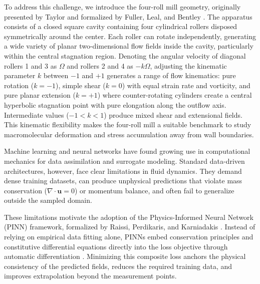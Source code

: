To address this challenge, we introduce the four-roll mill geometry, originally
presented by Taylor \cite{taylor1934formation} and formalized by
Fuller, Leal, and Bentley \cite{fuller1980flow, fuller1981flow, bentley1986experimental}.
The apparatus consists of a closed square cavity containing four cylindrical rollers
disposed symmetrically around the center. Each roller can rotate independently,
generating a wide variety of planar two-dimensional flow fields inside the cavity,
particularly within the central stagnation region. Denoting the angular velocity
of diagonal rollers 1 and 3 as $\Omega$ and rollers 2 and 4 as $-k\Omega$,
adjusting the kinematic parameter $k$ between $-1$ and $+1$ generates a range of
flow kinematics: pure rotation ($k = -1$), simple shear ($k = 0$) with equal
strain rate and vorticity, and pure planar extension ($k = +1$) where
counter-rotating cylinders create a central hyperbolic stagnation point with pure
elongation along the outflow axis. Intermediate values ($-1 < k < 1$) produce
mixed shear and extensional fields. This kinematic flexibility makes the
four-roll mill a suitable benchmark to study macromolecular deformation and stress
accumulation away from wall boundaries.

Machine learning and neural networks have found growing use in computational
mechanics for data assimilation and surrogate modeling. Standard data-driven
architectures, however, face clear limitations in fluid dynamics. They demand
dense training datasets, can produce unphysical predictions that violate mass
conservation ($\nabla \cdot \boldsymbol{u} = 0$) or momentum balance, and often
fail to generalize outside the sampled domain.

These limitations motivate the adoption of the Physics-Informed Neural Network
(PINN) framework, formalized by Raissi, Perdikaris, and Karniadakis
\cite{raissi2019physics, cuomo2022scientific}. Instead of relying on empirical
data fitting alone, PINNs embed conservation principles and constitutive
differential equations directly into the loss objective through automatic
differentiation \cite{baydin2018automatic}. Minimizing this composite loss anchors
the physical consistency of the predicted fields, reduces the required training
data, and improves extrapolation beyond the measurement points.

